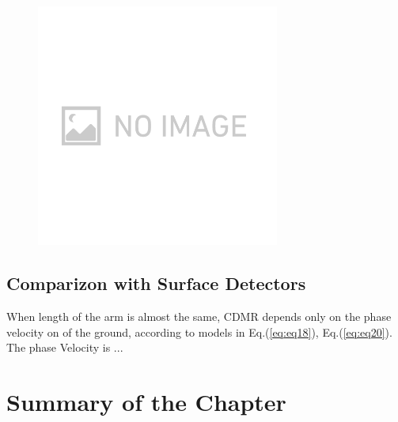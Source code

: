 \begin{figure}[H]
  \begin{center}
    \includegraphics[width=8cm]{../underground_seismic_noise/img_no_image.png}
  \end{center}
  \caption{}
  \label{img:img_seismometer_map}
\end{figure}



\subsection{Comparizon with Surface Detectors}
When length of the arm is almost the same, CDMR depends only on the phase velocity on of the ground, according to models in Eq.(\ref{eq:eq18}), Eq.(\ref{eq:eq20}). The phase Velocity is ...



\section{Summary of the Chapter}
